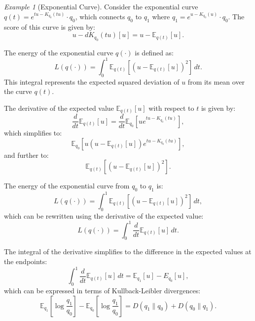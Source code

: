 \documentclass[axioms,article,submit,pdftex,moreauthors]{Definitions/mdpi}
\theoremstyle{plain}
\theoremstyle{remark}
\newtheorem{myexample}{Example}
\begin{document}
\begin{myexample}[Exponential Curve] Consider the exponential curve \( q(t) = e^{tu - K_{q_0}(tu)} \cdot q_0 \), which connects \( q_0 \) to \( q_1 \) where \( q_1 = e^{u - K_{q_0}(u)} \cdot q_0 \). The score of this curve is given by:
\begin{equation*} 
u - dK_{q_0}(tu)[u] = u - \mathbb{E}_{q(t)}[u].
\end{equation*} 

The energy of the exponential curve \( q(\cdot) \) is defined as:
\begin{equation*} 
L(q(\cdot)) = \int_0^1 \mathbb{E}_{q(t)} \left[ (u - \mathbb{E}_{q(t)}[u])^2 \right] \, dt.
\end{equation*} 
This integral represents the expected squared deviation of \( u \) from its mean over the curve \( q(t) \).

The derivative of the expected value \( \mathbb{E}_{q(t)}[u] \) with respect to \( t \) is given by:
\begin{equation*} 
\frac{d}{dt} \mathbb{E}_{q(t)}[u] = \frac{d}{dt} \mathbb{E}_{q_0} \left[ u e^{tu - K_{q_0}(tu)} \right],
\end{equation*} 
which simplifies to:
\begin{equation*} 
\mathbb{E}_{q_0} \left[ u (u - \mathbb{E}_{q(t)}[u]) e^{tu - K_{q_0}(tu)} \right],
\end{equation*} 
and further to:
\begin{equation*} 
\mathbb{E}_{q(t)} \left[ (u - \mathbb{E}_{q(t)}[u])^2 \right].
\end{equation*} 

The energy of the exponential curve from \( q_0 \) to \( q_1 \) is:
\begin{equation*} 
L(q(\cdot)) = \int_0^1 \mathbb{E}_{q(t)} \left[ (u - \mathbb{E}_{q(t)}[u])^2 \right] \, dt,
\end{equation*} 
which can be rewritten using the derivative of the expected value:
\begin{equation*} 
L(q(\cdot)) = \int_0^1 \frac{d}{dt} \mathbb{E}_{q(t)}[u] \, dt.
\end{equation*} 

The integral of the derivative simplifies to the difference in the expected values at the endpoints:
\begin{equation*} 
\int_0^1 \frac{d}{dt} \mathbb{E}_{q(t)}[u] \, dt = \mathbb{E}_{q_1}[u] - E_{q_0}[u],
\end{equation*} 
which can be expressed in terms of Kullback-Leibler divergences:
\begin{equation*} 
\mathbb{E}_{q_1} \left[ \log \frac{q_1}{q_0} \right] - \mathbb{E}_{q_0} \left[ \log \frac{q_1}{q_0} \right] = D(q_1 \parallel q_0) + D(q_0 \parallel q_1).
\end{equation*} 


\end{myexample}
\end{document}
